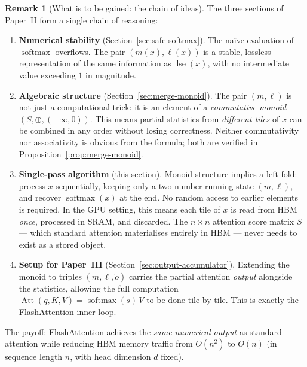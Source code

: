 \documentclass[11pt]{amsart}
\theoremstyle{plain}
\theoremstyle{definition}
\newtheorem{remark}[theorem]{Remark}
\newcommand{\softmax}{\operatorname{softmax}}
\newcommand{\logsumexp}{\operatorname{lse}}
\newcommand{\Att}{\operatorname{Att}}
\begin{document}
\begin{remark}[What is to be gained: the chain of ideas]
The three sections of Paper~II form a single chain of reasoning:
\begin{enumerate}[label=(\arabic*)]
    \item \textbf{Numerical stability} (Section~\ref{sec:safe-softmax}).
    The na\"ive evaluation of $\softmax$ overflows.  The pair $(m(x),\ell(x))$
    is a stable, lossless representation of the same information as
    $\logsumexp(x)$, with no intermediate value exceeding $1$ in magnitude.

    \item \textbf{Algebraic structure} (Section~\ref{sec:merge-monoid}).
    The pair $(m,\ell)$ is not just a computational trick: it is an element
    of a \emph{commutative monoid} $(S,\oplus,(-\infty,0))$.  This means
    partial statistics from \emph{different tiles} of $x$ can be combined in
    any order without losing correctness.  Neither commutativity nor
    associativity is obvious from the formula; both are verified in
    Proposition~\ref{prop:merge-monoid}.

    \item \textbf{Single-pass algorithm} (this section).
    Monoid structure implies a left fold: process $x$ sequentially, keeping
    only a two-number running state $(m,\ell)$, and recover $\softmax(x)$
    at the end.  No random access to earlier elements is required.  In the
    GPU setting, this means each tile of $x$ is read from HBM \emph{once},
    processed in SRAM, and discarded.  The $n\times n$ attention score matrix
    $S$ --- which standard attention materialises entirely in HBM --- never
    needs to exist as a stored object.

    \item \textbf{Setup for Paper~III} (Section~\ref{sec:output-accumulator}).
    Extending the monoid to triples $(m,\ell,\tilde{o})$ carries the partial
    attention \emph{output} alongside the statistics, allowing the full
    computation $\Att(q,K,V) = \softmax(s)\,V$ to be done tile by tile.
    This is exactly the FlashAttention inner loop.
\end{enumerate}
The payoff: FlashAttention achieves the \emph{same numerical output} as
standard attention while reducing HBM memory traffic from $O(n^2)$ to $O(n)$
(in sequence length $n$, with head dimension $d$ fixed).
\end{remark}

\end{document}
